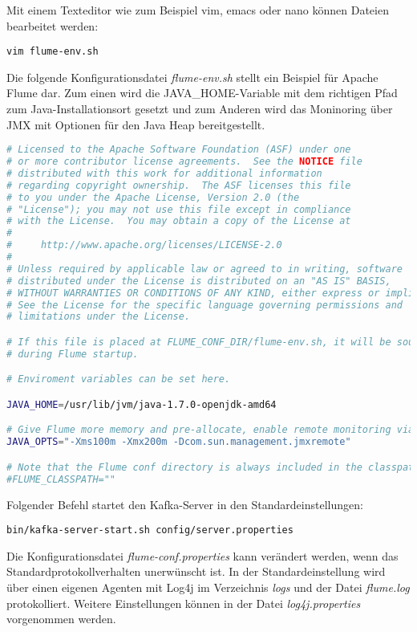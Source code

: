 Mit einem Texteditor wie zum Beispiel vim, emacs oder nano können Dateien bearbeitet werden:
\begin{verbatim}
vim flume-env.sh
\end{verbatim}

Die folgende Konfigurationsdatei \textit{flume-env.sh} stellt ein Beispiel für Apache Flume dar. Zum einen wird die JAVA\_HOME-Variable mit dem richtigen Pfad zum Java-Installationsort gesetzt und zum Anderen wird das Moninoring über JMX mit Optionen für den Java Heap bereitgestellt.

\begin{lstlisting}[language=BASH, label=lst:flumeEnv, caption=Apache Flume Konfiguration]
# Licensed to the Apache Software Foundation (ASF) under one
# or more contributor license agreements.  See the NOTICE file
# distributed with this work for additional information
# regarding copyright ownership.  The ASF licenses this file
# to you under the Apache License, Version 2.0 (the
# "License"); you may not use this file except in compliance
# with the License.  You may obtain a copy of the License at
#
#     http://www.apache.org/licenses/LICENSE-2.0
#
# Unless required by applicable law or agreed to in writing, software
# distributed under the License is distributed on an "AS IS" BASIS,
# WITHOUT WARRANTIES OR CONDITIONS OF ANY KIND, either express or implied.
# See the License for the specific language governing permissions and
# limitations under the License.

# If this file is placed at FLUME_CONF_DIR/flume-env.sh, it will be sourced
# during Flume startup.

# Enviroment variables can be set here.

JAVA_HOME=/usr/lib/jvm/java-1.7.0-openjdk-amd64

# Give Flume more memory and pre-allocate, enable remote monitoring via JMX
JAVA_OPTS="-Xms100m -Xmx200m -Dcom.sun.management.jmxremote"

# Note that the Flume conf directory is always included in the classpath.
#FLUME_CLASSPATH=""
\end{lstlisting}

Folgender Befehl startet den Kafka-Server in den Standardeinstellungen:
\begin{verbatim}
bin/kafka-server-start.sh config/server.properties
\end{verbatim}

Die Konfigurationsdatei \textit{flume-conf.properties} kann verändert werden, wenn das Standardprotokollverhalten unerwünscht ist. In der Standardeinstellung wird über einen eigenen Agenten mit Log4j im Verzeichnis \textit{logs} und der Datei \textit{flume.log} protokolliert. Weitere Einstellungen können in der Datei \textit{log4j.properties} vorgenommen werden.

